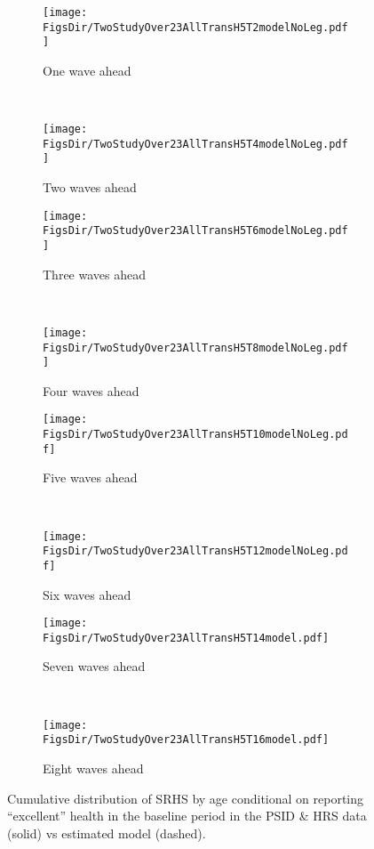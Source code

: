 \documentclass[12pt,pdftex,letterpaper]{article}
\newcommand{\RootDir}{..}
\newcommand{\FigsDir}{\RootDir/Figures}
\begin{document}
\begin{figure}
	\centering
	\begin{subfigure}[b]{0.48\textwidth}
		\texttt{[image: \\FigsDir/TwoStudyOver23AllTransH5T2modelNoLeg.pdf]}
		\caption{One wave ahead}\label{fig:Model1AheadExcellent}
	\end{subfigure}
	~
	\begin{subfigure}[b]{0.48\textwidth}
		\texttt{[image: \\FigsDir/TwoStudyOver23AllTransH5T4modelNoLeg.pdf]}
		\caption{Two waves ahead}\label{fig:Model2AheadExcellent}
	\end{subfigure}
	
	\begin{subfigure}[b]{0.48\textwidth}
		\texttt{[image: \\FigsDir/TwoStudyOver23AllTransH5T6modelNoLeg.pdf]}
		\caption{Three waves ahead}\label{fig:Model3AheadExcellent}
	\end{subfigure}
	~
	\begin{subfigure}[b]{0.48\textwidth}
		\texttt{[image: \\FigsDir/TwoStudyOver23AllTransH5T8modelNoLeg.pdf]}
		\caption{Four waves ahead}\label{fig:Model4AheadExcellent}
	\end{subfigure}
	
	\begin{subfigure}[b]{0.48\textwidth}
		\texttt{[image: \\FigsDir/TwoStudyOver23AllTransH5T10modelNoLeg.pdf]}
		\caption{Five waves ahead}\label{fig:Model5AheadExcellent}
	\end{subfigure}
	~
	\begin{subfigure}[b]{0.48\textwidth}
		\texttt{[image: \\FigsDir/TwoStudyOver23AllTransH5T12modelNoLeg.pdf]}
		\caption{Six waves ahead}\label{fig:Model6AheadExcellent}
	\end{subfigure}
	
	\begin{subfigure}[b]{0.48\textwidth}
		\texttt{[image: \\FigsDir/TwoStudyOver23AllTransH5T14model.pdf]}
		\caption{Seven waves ahead}\label{fig:Model7AheadExcellent}
	\end{subfigure}
	~
	\begin{subfigure}[b]{0.48\textwidth}
		\texttt{[image: \\FigsDir/TwoStudyOver23AllTransH5T16model.pdf]}
		\caption{Eight waves ahead}\label{fig:Model8AheadExcellent}
	\end{subfigure}
	\caption{Cumulative distribution of SRHS by age conditional on reporting ``excellent'' health in the baseline period in the PSID \& HRS data (solid) vs estimated model (dashed).}\label{fig:ModelTransEX}
\end{figure}
\end{document}
